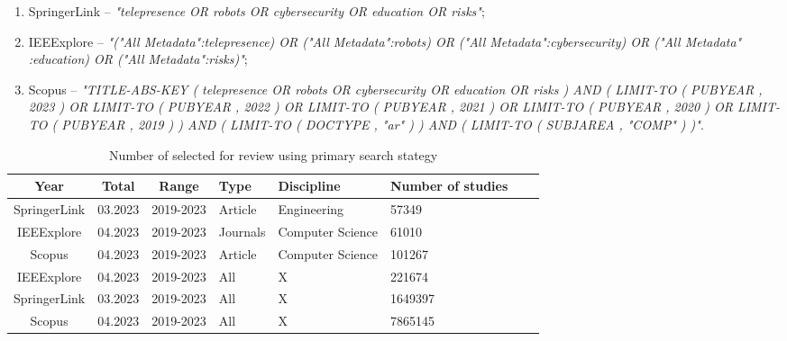 \begin{enumerate}
\item SpringerLink -- \textit{"telepresence OR robots OR cybersecurity OR education OR risks"};
\item IEEExplore -- \textit{"("All Metadata":telepresence) OR ("All Metadata":robots) OR ("All Metadata":cybersecurity) OR ("All Metadata"
:education) OR ("All Metadata":risks)"};
\item Scopus -- \textit{"TITLE-ABS-KEY ( telepresence OR robots OR cybersecurity OR education OR risks )  AND  ( LIMIT-TO ( PUBYEAR ,
2023 )  OR LIMIT-TO ( PUBYEAR ,  2022 )  OR LIMIT-TO ( PUBYEAR ,  2021 )  OR LIMIT-TO ( PUBYEAR ,  2020 )  OR LIMIT-TO ( PUBYEAR
,  2019 ) )  AND  ( LIMIT-TO ( DOCTYPE ,  "ar" ) )  AND  ( LIMIT-TO ( SUBJAREA ,  "COMP" ) )"}.
\end{enumerate}


\begin{table}[htb]
\centering
\smaller
\caption{Number of selected for review using primary search stategy}
\label{tab:query-results}
\begin{tabularx}{\textwidth}{|c|c|c|Y|Y|Y|Y|Y|}
\hline
\textbf{Year} & \textbf{Total} & \textbf{Range} & \textbf{Type} & \textbf{Discipline} & \textbf{Number of studies} \\\hline
SpringerLink  & 03.2023        & 2019-2023      & Article       & Engineering         & 57349                      \\\hline
IEEExplore    & 04.2023        & 2019-2023      & Journals      & Computer Science    & 61010                      \\\hline
Scopus        & 04.2023        & 2019-2023      & Article       & Computer Science    & 101267                     \\\hline
IEEExplore    & 04.2023        & 2019-2023      & All           & X                   & 221674                     \\\hline
SpringerLink  & 03.2023        & 2019-2023      & All           & X                   & 1649397                    \\\hline
Scopus        & 04.2023        & 2019-2023      & All           & X                   & 7865145                    \\\hline
\end{tabularx}
\end{table}


